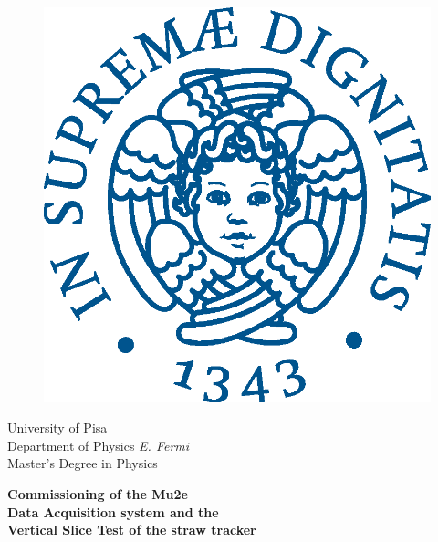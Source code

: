 \begin{titlepage}
\begin{figure}[!htb]
    \centering
    \includegraphics[keepaspectratio=true,scale=0.5]{figures/eps/cherubinFrontespizio.eps}
\end{figure}

\begin{center}
    \LARGE{University of Pisa}
    \vspace{5mm}
    \\ \large{Department of Physics \textit{E. Fermi}}
    \vspace{5mm}
    \\ \LARGE{Master's Degree in Physics}
\end{center}

\vspace{15mm}
\begin{center}
    {\Large{\bf Commissioning of the Mu2e\\ \vspace{3mm} Data Acquisition system and the\\ \vspace{5mm} Vertical Slice Test of the straw tracker}}
    
    

\end{center}
\end{titlepage}
